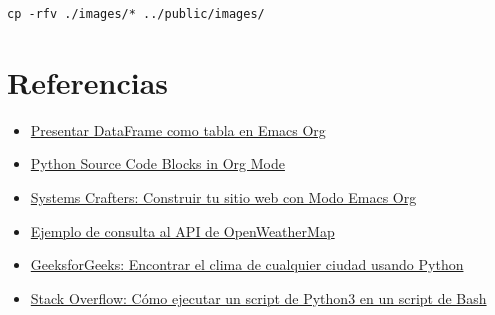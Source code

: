 \documentclass[11pt]{article}
\begin{document}
\begin{verbatim}
cp -rfv ./images/* ../public/images/
\end{verbatim}

\section{Referencias}
\label{sec:org76e6d33}
\begin{itemize}
\item \href{https://emacs.stackexchange.com/questions/28715/get-pandas-data-frame-as-a-table-in-org-babel}{Presentar DataFrame como tabla en Emacs Org}
\item \href{https://orgmode.org/worg/org-contrib/babel/languages/ob-doc-python.html}{Python Source Code Blocks in Org Mode}
\item \href{https://systemcrafters.net/publishing-websites-with-org-mode/building-the-site/}{Systems Crafters: Construir tu sitio web con Modo Emacs Org}
\item \href{https://iabigdata-soka-4ae9e223e32444ac5ae3d78afbd55fd9aa6da1c19d9679bf.gitlab.io/post/2024-06-06-pia\_openweathermap\_ex/}{Ejemplo de consulta al API de OpenWeatherMap}
\item \href{https://www.geeksforgeeks.org/python/python-find-current-weather-of-any-city-using-openweathermap-api/}{GeeksforGeeks: Encontrar el clima de cualquier ciudad usando Python}
\item \href{https://stackoverflow.com/questions/59033793/how-to-execute-a-python3-script-in-a-bash-script}{Stack Overflow: Cómo ejecutar un script de Python3 en un script de Bash}
\end{itemize}
\end{document}
